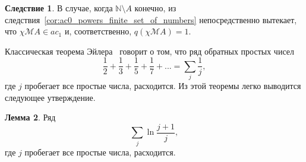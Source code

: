 \documentclass[a4paper,openbib]{article}
\theoremstyle{definition}
\newtheorem{lemma}{Лемма}[section]
\newtheorem{corollary}[lemma]{Следствие}
\begin{document}
\begin{corollary}
	В случае, когда $\mathbb{N}\setminus A$ конечно,
	из следствия~\ref{cor:ac0_powers_finite_set_of_numbers} непосредственно вытекает, что $\chi\mathscr{M}A\in ac_1$
	и, соответственно, $q(\chi\mathscr{M}A)=1$.
\end{corollary}



Классическая теорема Эйлера~\cite{euler1737variae} говорит о том, что
ряд обратных простых чисел
\begin{equation}
	\frac{1}{2} + \frac{1}{3} + \frac{1}{5} + \frac{1}{7} + ...
	=
	\sum_j \frac{1}{j},
\end{equation}
где $j$ пробегает все простые числа, расходится.
Из этой теоремы легко выводится следующее утверждение.

\begin{lemma}
	\label{cor:ac0_primes_sum_ln_diverges}
	Ряд
	\begin{equation}
		\sum_j \ln \frac{j+1}{j}
		,
	\end{equation}
	где $j$ пробегает все простые числа, расходится.
\end{lemma}
\end{document}
